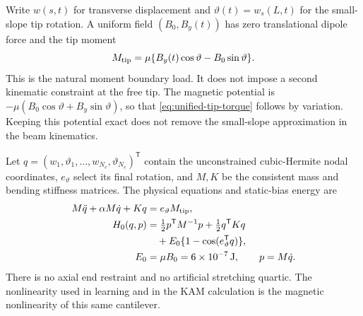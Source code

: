 Write $w(s,t)$ for transverse displacement and
$\vartheta(t)=w_s(L,t)$ for the small-slope tip rotation. A uniform field
$(B_0,B_y(t))$ has zero translational dipole force and the tip moment
\begin{equation}
 M_{\rm tip}=\mu\{B_y(t)\cos\vartheta-B_0\sin\vartheta\}.
 \label{eq:unified-tip-torque}
\end{equation}
This is the natural moment boundary load. It does not impose a second
kinematic constraint at the free tip. The magnetic potential is
$-\mu(B_0\cos\vartheta+B_y\sin\vartheta)$, so that
\eqref{eq:unified-tip-torque} follows by variation. Keeping this potential
exact does not remove the small-slope approximation in the beam kinematics.

Let $q=(w_1,\vartheta_1,\ldots,w_{N_e},\vartheta_{N_e})^{\mathsf T}$
contain the unconstrained cubic-Hermite nodal coordinates, $e_\vartheta$
select its final rotation, and $M,K$ be the consistent mass and bending
stiffness matrices. The physical equations and static-bias energy are
\begin{align}
 M\ddot q+\alpha M\dot q+Kq
 &=e_\vartheta M_{\rm tip},
 \label{eq:unified-fe}\\
 H_0(q,p)&=\tfrac12p^{\mathsf T}M^{-1}p+\tfrac12q^{\mathsf T}Kq\notag\\
 &\quad+E_0\{1-\cos(e_\vartheta^{\mathsf T}q)\},
 \label{eq:unified-SI-H}\\
 E_0&=\mu B_0=6\times10^{-7}\,\mathrm J,\qquad p=M\dot q.
\end{align}
There is no axial end restraint and no artificial stretching quartic.
The nonlinearity used in learning and in the KAM calculation is the
magnetic nonlinearity of this same cantilever.

